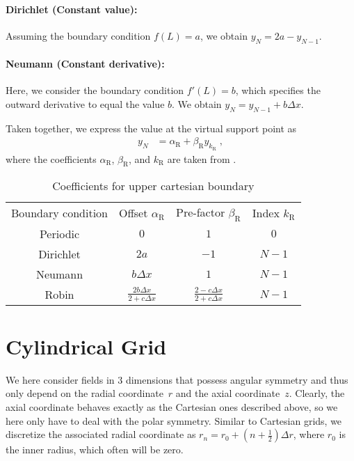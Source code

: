 \documentclass[
	superscriptaddress,
	twocolumn,
	aps, prl
]{revtex4-1}
\newcommand{\dx}{\Delta x}
\newcommand{\dr}{\Delta r}
\newcommand{\R}{_\mathrm{R}}
\begin{document}
\paragraph{Dirichlet (Constant value):}
Assuming the boundary condition $f(L) = a$, we obtain $y_N = 2a - y_{N-1}$.

\paragraph{Neumann (Constant derivative):}
Here, we consider the boundary condition $f'(L) = b$, which specifies the outward derivative to equal the value $b$.
We obtain $y_N = y_{N-1} + b \dx$.


Taken together, we express the value at the virtual support point as
\begin{align}
	y_N &= \alpha\R + \beta\R y_{k\R}
	\;,
\end{align}
where the coefficients $\alpha\R$, $\beta\R$, and $k\R$ are taken from .


\begin{table}[t]
\caption{\label{tab:cartesian_upper}%
Coefficients for upper cartesian boundary
}
\begin{ruledtabular}
	\begin{tabular}{cccc}
		Boundary condition & Offset $\alpha\R$ & Pre-factor $\beta\R$  & Index $k\R$\\
		\colrule
		Periodic & $0$ & $1$ & $0$ \\
		Dirichlet & $2a$ & $-1$ & $N-1$ \\
		Neumann & $b\dx$ & $1$  & $N-1$ \\
		Robin & $\frac{2b\dx}{2 + c \dx}$ &
				$\frac{2 - c\dx}{2 + c \dx}$ & $N-1$ \\
	\end{tabular}
\end{ruledtabular}
\end{table}


\section{Cylindrical Grid}
We here consider fields in $3$ dimensions that possess angular symmetry and thus only depend on the radial coordinate~$r$ and the axial coordinate~$z$.
Clearly, the axial coordinate behaves exactly as the Cartesian ones described above, so we here only have to deal with the polar symmetry.
Similar to Cartesian grids, we discretize the associated radial coordinate as $r_n = r_0 + (n + \frac12) \dr$, where $r_0$ is the inner radius, which often will be zero.
\end{document}
